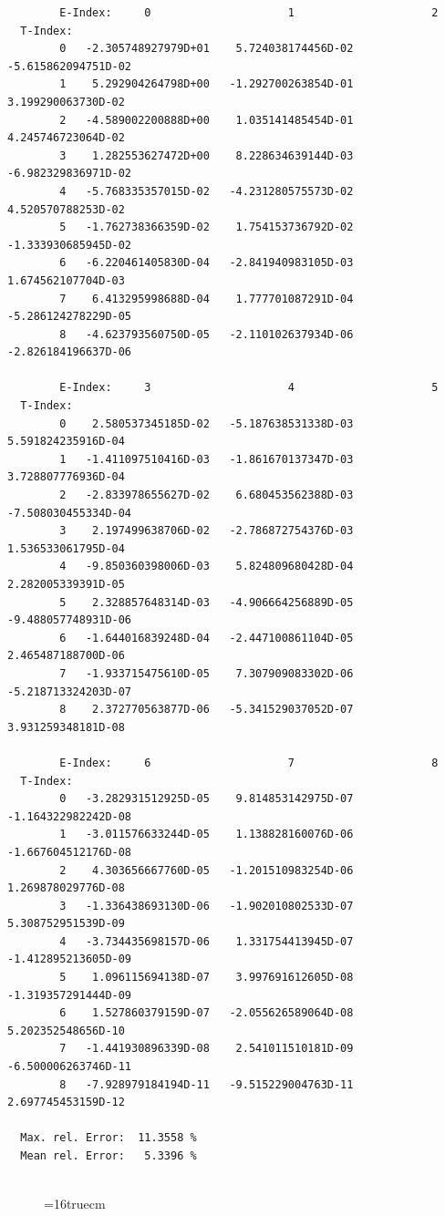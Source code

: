 \documentclass[12pt,dvips]{article}
\begin{document}
\begin{small}\begin{verbatim}
        E-Index:     0                     1                     2
  T-Index:
        0   -2.305748927979D+01    5.724038174456D-02   -5.615862094751D-02
        1    5.292904264798D+00   -1.292700263854D-01    3.199290063730D-02
        2   -4.589002200888D+00    1.035141485454D-01    4.245746723064D-02
        3    1.282553627472D+00    8.228634639144D-03   -6.982329836971D-02
        4   -5.768335357015D-02   -4.231280575573D-02    4.520570788253D-02
        5   -1.762738366359D-02    1.754153736792D-02   -1.333930685945D-02
        6   -6.220461405830D-04   -2.841940983105D-03    1.674562107704D-03
        7    6.413295998688D-04    1.777701087291D-04   -5.286124278229D-05
        8   -4.623793560750D-05   -2.110102637934D-06   -2.826184196637D-06

        E-Index:     3                     4                     5
  T-Index:
        0    2.580537345185D-02   -5.187638531338D-03    5.591824235916D-04
        1   -1.411097510416D-03   -1.861670137347D-03    3.728807776936D-04
        2   -2.833978655627D-02    6.680453562388D-03   -7.508030455334D-04
        3    2.197499638706D-02   -2.786872754376D-03    1.536533061795D-04
        4   -9.850360398006D-03    5.824809680428D-04    2.282005339391D-05
        5    2.328857648314D-03   -4.906664256889D-05   -9.488057748931D-06
        6   -1.644016839248D-04   -2.447100861104D-05    2.465487188700D-06
        7   -1.933715475610D-05    7.307909083302D-06   -5.218713324203D-07
        8    2.372770563877D-06   -5.341529037052D-07    3.931259348181D-08

        E-Index:     6                     7                     8
  T-Index:
        0   -3.282931512925D-05    9.814853142975D-07   -1.164322982242D-08
        1   -3.011576633244D-05    1.138828160076D-06   -1.667604512176D-08
        2    4.303656667760D-05   -1.201510983254D-06    1.269878029776D-08
        3   -1.336438693130D-06   -1.902010802533D-07    5.308752951539D-09
        4   -3.734435698157D-06    1.331754413945D-07   -1.412895213605D-09
        5    1.096115694138D-07    3.997691612605D-08   -1.319357291444D-09
        6    1.527860379159D-07   -2.055626589064D-08    5.202352548656D-10
        7   -1.441930896339D-08    2.541011510181D-09   -6.500006263746D-11
        8   -7.928979184194D-11   -9.515229004763D-11    2.697745453159D-12

  Max. rel. Error:  11.3558 %
  Mean rel. Error:   5.3396 %


\end{verbatim}\end{small}
\begin{figure} \label{2.2.5mad}
\epsfxsize=16truecm
\end{figure}
\newpage
\end{document}

